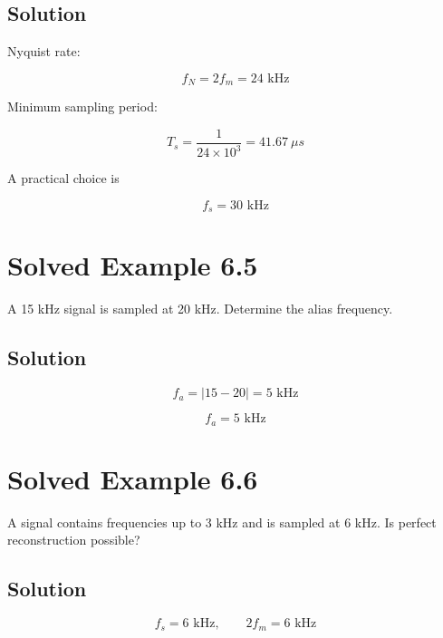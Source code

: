 
\subsection{Solution}

Nyquist rate:

\[
f_N=2f_m=24\text{ kHz}
\]

Minimum sampling period:

\[
T_s=\frac{1}{24\times10^3}=41.67\ \mu s
\]

A practical choice is

\[
\boxed{
f_s=30\text{ kHz}
}
\]


\section{Solved Example 6.5}

A 15 kHz signal is sampled at 20 kHz. Determine the alias frequency.


\subsection{Solution}

\[
f_a=|15-20|=5\text{ kHz}
\]

\[
\boxed{
f_a=5\text{ kHz}
}
\]


\section{Solved Example 6.6}

A signal contains frequencies up to 3 kHz and is sampled at 6 kHz. Is perfect
reconstruction possible?


\subsection{Solution}

\[
f_s=6\text{ kHz},
\qquad
2f_m=6\text{ kHz}
\]

